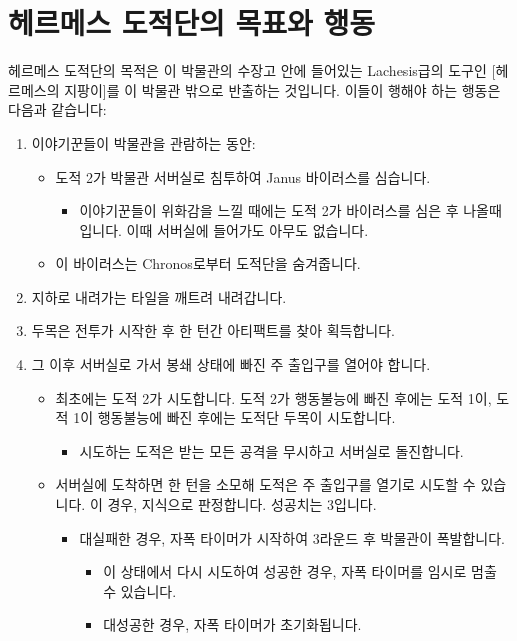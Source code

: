 \documentclass{report}
\begin{document}
	\section*{헤르메스 도적단의 목표와 행동}
	헤르메스 도적단의 목적은 이 박물관의 수장고 안에 들어있는 Lachesis급의 도구인 [헤르메스의 지팡이]를 이 박물관 밖으로 반출하는 것입니다. 이들이 행해야 하는 행동은 다음과 같습니다:
	\begin{enumerate}
		\item 이야기꾼들이 박물관을 관람하는 동안:
		\begin{itemize}
			\item 도적 2가 박물관 서버실로 침투하여 Janus 바이러스를 심습니다.
			\begin{itemize}
				\item 이야기꾼들이 위화감을 느낄 때에는 도적 2가 바이러스를 심은 후 나올때입니다. 이때 서버실에 들어가도 아무도 없습니다.
			\end{itemize}
			\item 이 바이러스는 Chronos로부터 도적단을 숨겨줍니다.
		\end{itemize}
		\item 지하로 내려가는 타일을 깨트려 내려갑니다.
		\item 두목은 전투가 시작한 후 한 턴간 아티팩트를 찾아 획득합니다.
		\item 그 이후 서버실로 가서 봉쇄 상태에 빠진 주 출입구를 열어야 합니다.
		\begin{itemize}
			\item 최초에는 도적 2가 시도합니다. 도적 2가 행동불능에 빠진 후에는 도적 1이, 도적 1이 행동불능에 빠진 후에는 도적단 두목이 시도합니다.
			\begin{itemize}
				\item 시도하는 도적은 받는 모든 공격을 무시하고 서버실로 돌진합니다.
			\end{itemize}
			\item 서버실에 도착하면 한 턴을 소모해 도적은 주 출입구를 열기로 시도할 수 있습니다. 이 경우, 지식으로 판정합니다. 성공치는 3입니다.
			\begin{itemize}
				\item 대실패한 경우, 자폭 타이머가 시작하여 3라운드 후 박물관이 폭발합니다.
				\begin{itemize}
					\item 이 상태에서 다시 시도하여 성공한 경우, 자폭 타이머를 임시로 멈출 수 있습니다.
					\item 대성공한 경우, 자폭 타이머가 초기화됩니다.
				\end{itemize}

\end{itemize}
\end{itemize}
\end{enumerate}
\end{document}
